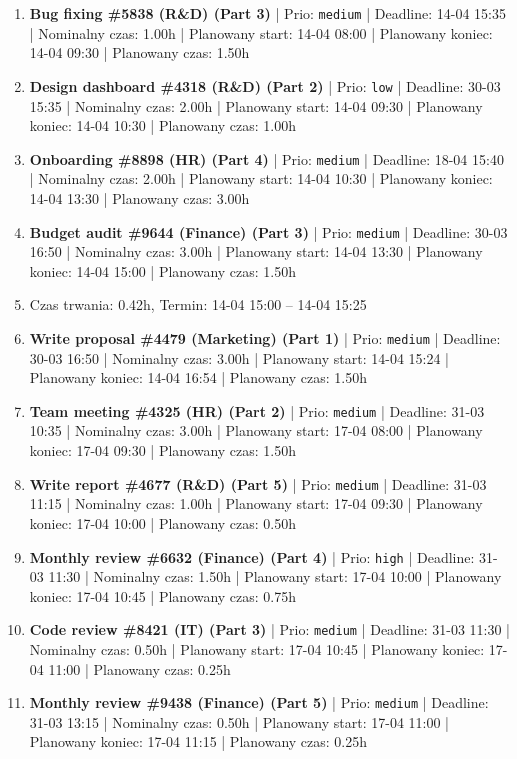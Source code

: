 {\begin{enumerate}
  \item [\textbf{14637}] \textbf{Bug fixing \#5838 (R\&D) (Part 3)} | Prio: \texttt{medium} | Deadline: 14-04 15:35 | Nominalny czas: 1.00h | Planowany start: 14-04 08:00 | Planowany koniec: 14-04 09:30 | Planowany czas: 1.50h
  \item [\textbf{14691}] \textbf{Design dashboard \#4318 (R\&D) (Part 2)} | Prio: \texttt{low} | Deadline: 30-03 15:35 | Nominalny czas: 2.00h | Planowany start: 14-04 09:30 | Planowany koniec: 14-04 10:30 | Planowany czas: 1.00h
  \item [\textbf{14636}] \textbf{Onboarding \#8898 (HR) (Part 4)} | Prio: \texttt{medium} | Deadline: 18-04 15:40 | Nominalny czas: 2.00h | Planowany start: 14-04 10:30 | Planowany koniec: 14-04 13:30 | Planowany czas: 3.00h
  \item [\textbf{14659}] \textbf{Budget audit \#9644 (Finance) (Part 3)} | Prio: \texttt{medium} | Deadline: 30-03 16:50 | Nominalny czas: 3.00h | Planowany start: 14-04 13:30 | Planowany koniec: 14-04 15:00 | Planowany czas: 1.50h
  \item [\textbf{PRZERWA}] Czas trwania: 0.42h, Termin: 14-04 15:00 -- 14-04 15:25
  \item [\textbf{14660}] \textbf{Write proposal \#4479 (Marketing) (Part 1)} | Prio: \texttt{medium} | Deadline: 30-03 16:50 | Nominalny czas: 3.00h | Planowany start: 14-04 15:24 | Planowany koniec: 14-04 16:54 | Planowany czas: 1.50h
  \item [\textbf{14641}] \textbf{Team meeting \#4325 (HR) (Part 2)} | Prio: \texttt{medium} | Deadline: 31-03 10:35 | Nominalny czas: 3.00h | Planowany start: 17-04 08:00 | Planowany koniec: 17-04 09:30 | Planowany czas: 1.50h
  \item [\textbf{14640}] \textbf{Write report \#4677 (R\&D) (Part 5)} | Prio: \texttt{medium} | Deadline: 31-03 11:15 | Nominalny czas: 1.00h | Planowany start: 17-04 09:30 | Planowany koniec: 17-04 10:00 | Planowany czas: 0.50h
  \item [\textbf{14615}] \textbf{Monthly review \#6632 (Finance) (Part 4)} | Prio: \texttt{high} | Deadline: 31-03 11:30 | Nominalny czas: 1.50h | Planowany start: 17-04 10:00 | Planowany koniec: 17-04 10:45 | Planowany czas: 0.75h
  \item [\textbf{14665}] \textbf{Code review \#8421 (IT) (Part 3)} | Prio: \texttt{medium} | Deadline: 31-03 11:30 | Nominalny czas: 0.50h | Planowany start: 17-04 10:45 | Planowany koniec: 17-04 11:00 | Planowany czas: 0.25h
  \item [\textbf{14656}] \textbf{Monthly review \#9438 (Finance) (Part 5)} | Prio: \texttt{medium} | Deadline: 31-03 13:15 | Nominalny czas: 0.50h | Planowany start: 17-04 11:00 | Planowany koniec: 17-04 11:15 | Planowany czas: 0.25h

\end{enumerate}}
